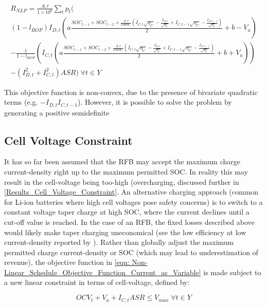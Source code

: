 \documentclass[preprint,3p,review,authoryear,10pt]{elsarticle}
\begin{document}
\begin{equation}
    \label{eqn: NLP_true_OCV_long_form}
    \begin{split}
R_{NLP} = \frac{A.\tau}{1\times 10^{6}}\sum_{t}p_{t}(\\
(1-l_{BOP})I_{D, t}(a\frac{SOC_{t-1} + SOC_{t-2} + \frac{A.\tau}{1000C}(I_{C,t}\sqrt{\eta_C} - \frac{I_{D,t}}{\sqrt{\eta_C}} +  I_{C,t-1}\sqrt{\eta_C} - \frac{I_{D,t-1}}{\sqrt{\eta_C}})}{2} + b - V_a)\\ - \frac{1}{1-l_{BOP}}(I_{C, t}(a\frac{SOC_{t-1} +  SOC_{t-2} + \frac{A.\tau}{1000C}(I_{C,t}\sqrt{\eta_C} - \frac{I_{D,t}}{\sqrt{\eta_C}} + I_{C,t-1}\sqrt{\eta_C} - \frac{I_{D,t-1}}{\sqrt{\eta_C}})}{2} + b + V_a))\\ 
- (I_{D,t}^{2} + I_{C,t}^{2})ASR) \; \forall t \in Y
\end{split}
\end{equation}


This objective function is non-convex, due to the presence of bivariate quadratic terms  (e.g. $-I_{D,t}I_{C,t-1}$). However, it is possible to solve the problem by generating a positive semidefinite


\subsection{Cell Voltage Constraint}
\label{Model_Formulation_Constraint_Cell_Voltage}
It has so far been assumed that the RFB may accept the maximum charge current-density right up to the maximum permitted SOC. In reality this may result in the cell-voltage being too-high (overcharging, discussed further in \cref{Results_Cell_Voltage_Constraint}. An alternative charging approach (common for Li-ion batteries where high cell voltages pose safety concerns) is to switch to a constant voltage taper charge at high SOC, where the current declines until a cut-off value is reached. In the case of an RFB, the fixed losses described above would likely make taper charging uneconomical (see the low efficiency at low current-density reported by \cite{Nguyen2014}). Rather than globally adjust the maximum permitted charge current-density or SOC (which may lead to underestimation of revenue), the objective function in \cref{eqn: Non-Linear_Schedule_Objective_Function_Current_as_Variable} is made subject to a new linear constraint in terms of cell-voltage, defined by:
    
    \begin{equation}
\label{eqn: Cell_Voltage_Constraint}
OCV_t + V_a + I_{C,t}ASR \leq V_{max} \; \forall t \in Y
\end{equation}
\end{document}
